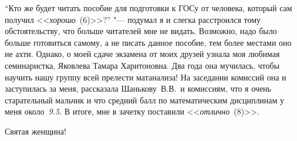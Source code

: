 ``Кто же будет читать пособие для подготовки к ГОСу от человека, который сам получил <<\textit{хорошо}~(6)>>?'' "--- подумал я и слегка расстроился тому обстоятельству, что больше читателей мне не видать. Возможно, надо было больше готовиться самому, а не писать данное пособие, тем более местами оно не ахти. Однако, о моей сдаче экзамена от моих друзей узнала моя любимая семинаристка, Яковлева Тамара Харитоновна. Два года она мучилась, чтобы научить нашу группу всей прелести матанализа! На заседании комиссий она и заступилась за меня, рассказала Шанькову~В.В.~и комиссиям, что я очень старательный мальчик и что средний балл по математическим дисциплинам у меня около~\textit{9.5}. В итоге, мне в зачетку поставили <<\textit{отлично}~(8)>>. 

Святая женщина!